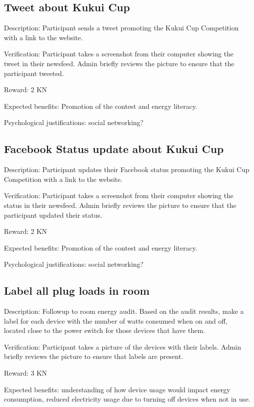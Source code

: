 \subsection{Tweet about Kukui Cup}

Description: Participant sends a tweet promoting the Kukui Cup Competition with a link to the website.

Verification: Participant takes a screenshot from their computer showing the tweet in their newsfeed. Admin briefly reviews the picture to ensure that the participant tweeted.

Reward: 2 KN

Expected benefits: Promotion of the contest and energy literacy.

Psychological justifications: social networking?

\subsection{Facebook Status update about Kukui Cup}

Description: Participant updates their Facebook status promoting the Kukui Cup Competition with a link to the website.

Verification: Participant takes a screenshot from their computer showing the status in their newsfeed. Admin briefly reviews the picture to ensure that the participant updated their status.

Reward: 2 KN

Expected benefits: Promotion of the contest and energy literacy.

Psychological justifications: social networking?

\subsection{Label all plug loads in room}

Description: Followup to room energy audit. Based on the audit results, make a label for each device with the number of watts consumed when on and off, located close to the power switch for those devices that have them.

Verification: Participant takes a picture of the devices with their labels. Admin briefly reviews the picture to ensure that labels are present.

Reward: 3 KN

Expected benefits: understanding of how device usage would impact energy consumption, reduced electricity usage due to turning off devices when not in use.

